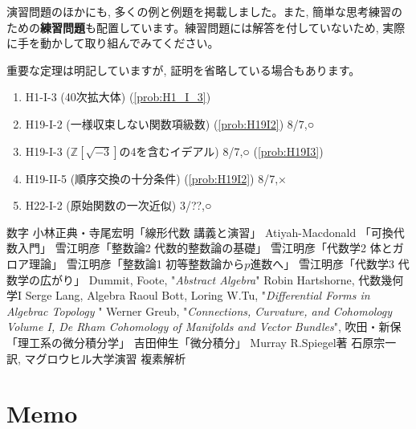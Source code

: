 \documentclass[twocolumn]{jbook}
\theoremstyle{definition}
\newcommand{\ben}{\begin{enumerate}}
\newcommand{\een}{\end{enumerate}}
\newcommand{\mb}{\mathbb} %
\newcommand{\tf}{\textbf}
\begin{document}
演習問題のほかにも, 多くの例と例題を掲載しました。また, 簡単な思考練習のための\tf{練習問題}も配置しています。練習問題には解答を付していないため, 実際に手を動かして取り組んでみてください。

重要な定理は明記していますが, 証明を省略している場合もあります。


\tableofcontents

\clearpage %

\ben[label=\arabic*.]
\item H1-I-3 (40次拡大体) (\ref{prob:H1_I_3})
\item H19-I-2 (一様収束しない関数項級数) (\ref{prob:H19I2}) 8/7,○
\item H19-I-3 ($\mb{Z}[\sqrt{-3}]$の4を含むイデアル) 8/7,○ (\ref{prob:H19I3})
\item H19-II-5 (順序交換の十分条件) (\ref{prob:H19I2}) 8/7,×
\item H22-I-2 (原始関数の一次近似) 3/??,○

\een


\begin{thebibliography}{数字}
	 小林正典・寺尾宏明「線形代数 講義と演習」
	 Atiyah-Macdonald 「可換代数入門」
	 雪江明彦「整数論2 代数的整数論の基礎」
	 雪江明彦「代数学2 体とガロア理論」
	 雪江明彦「整数論1 初等整数論から$p$進数へ」
	 雪江明彦「代数学3 代数学の広がり」
	 Dummit, Foote, "{\it Abstract Algebra}"
	 Robin Hartshorne, 代数幾何学I
	 Serge Lang, Algebra
	 Raoul Bott, Loring W.Tu, "{\it Differential Forms in Algebrac Topology }"
	 Werner Greub, "{\it Connections, Curvature, and Cohomology Volume I, De Rham Cohomology of Manifolds and Vector Bundles}",  %
	 吹田・新保「理工系の微分積分学」
	 吉田伸生「微分積分」
	 Murray R.Spiegel著 石原宗一 訳, マグロウヒル大学演習 複素解析
\end{thebibliography}



%
\part{Memo}

% 
\end{document}
